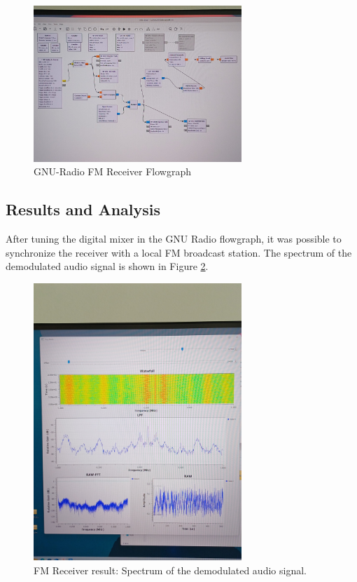\begin{figure}[H]
    \centering
    \includegraphics*[width=0.7\textwidth]{Images/RFFE_GNU.jpeg}
    \caption{GNU-Radio FM Receiver Flowgraph}
    \label{fig:RFFE_GNU}
\end{figure}


\subsection{Results and Analysis}

After tuning the digital mixer in the GNU Radio flowgraph, it was possible to synchronize the receiver with a local FM broadcast station. The spectrum of the demodulated audio signal is shown in Figure \ref{fig:RFFE_Result}.

\begin{figure}[H]
    \centering
    \includegraphics*[width=0.7\textwidth]{Images/RFFE_Result.jpeg}
    \caption{FM Receiver result: Spectrum of the demodulated audio signal.}
    \label{fig:RFFE_Result}
\end{figure}

